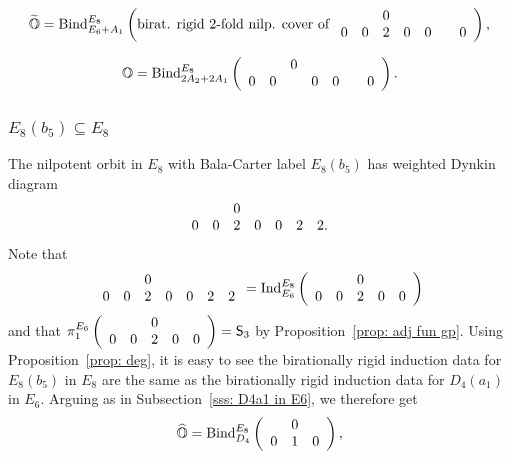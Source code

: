 \documentclass[11pt]{amsart}
\renewcommand{\O}{{\mathbb O}}
\newcommand{\Sym}{{\mathsf{S}}}
\newcommand{\Ind}{{{\mbox{\rm Ind}}}}
\newcommand{\BInd}{{{\mbox{\rm Bind}}}}
\newcommand{\covO}{\widetilde{\O}}
\newcommand{\hatO}{\widehat{\O}}
\numberwithin{equation}{section}
\begin{document}
	$$\covO=\BInd_{E_6+  A_1}^{E_8}\left(\mbox{birat. rigid 2-fold nilp. cover of }\begin{array}{c c c c c c c}
		& & 0 & & & & \\
		0 & 0 & 2 & 0 & 0 & & 0 \\
	\end{array}\right),$$
	
	$$\O=\BInd_{2 A_2 + 2 A_1}^{E_8}\left(\begin{array}{c c c c c c c}
		& & 0 & & & & \\
		0 & 0 &  & 0 & 0 & & 0 \\
	\end{array}\right).$$
	
	\subsubsection{\texorpdfstring{$E_8(b_5)\subseteq E_8$}{E8b5 in E8}}\label{sss: E8b5 in E8}
	
	The nilpotent orbit in $E_8$ with Bala-Carter label $E_8(b_5)$ has weighted Dynkin diagram 
	$$\begin{array}{c c c c c c c}
		& & 0 & & & &  \\
		0 & 0 & 2 & 0 & 0 & 2 & 2. \\
	\end{array}$$
	Note that $$\begin{array}{c c c c c c c}
		& & 0 & & & &  \\
		0 & 0 & 2 & 0 & 0 & 2 & 2 \\
	\end{array}=\Ind_{E_6}^{E_8}\left(\begin{array}{c c c c c}
		& & 0 & & \\
		0 & 0 & 2 & 0 & 0 \\
	\end{array}\right)$$ and that $\pi_1^{E_6}\left(\begin{array}{c c c c c}
		& & 0 & & \\
		0 & 0 & 2 & 0 & 0 \\
	\end{array}\right)=\Sym_3$ by Proposition~\ref{prop: adj fun gp}. Using Proposition~\ref{prop: deg}, it is easy to see the birationally rigid induction data for $E_8(b_5)$ in $E_8$ are the same as the birationally rigid induction data for $D_4(a_1)$ in $E_6$. Arguing as in Subsection~\ref{sss: D4a1 in E6}, we therefore get 
	$$\hatO=\BInd_{D_4}^{E_8}\left(\begin{array}{c c c}
		& 0 & \\
		0 & 1 & 0  \\
	\end{array}\right),$$
	
\end{document}
